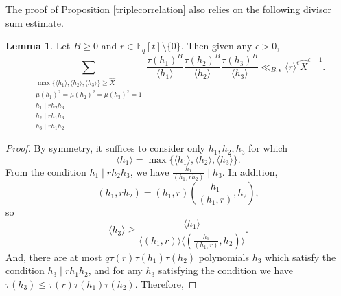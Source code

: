 \documentclass{article}
\theoremstyle{definition}
\newtheorem{lem}{Lemma}[section]
\theoremstyle{definition}
\theoremstyle{remark}
\newcommand{\F}{\mathbb{F}_q[t]}
\newcommand{\1}{\mathbf{1}}
\numberwithin{equation}{section}
\begin{document}
The proof of Proposition \ref{triplecorrelation} also relies on the following divisor sum estimate. 
\begin{lem}\label{bound2}
Let $B\geq 0$ and $r\in \F\setminus\{0\}$. Then given any $\epsilon>0$,
\[\sum_{\substack{\max\{\langle h_1\rangle, \langle h_2\rangle, \langle h_3\rangle\}\geq \widehat{X}\\ \mu(h_1)^2=\mu(h_2)^2=\mu(h_3)^2=1\\ h_1\mid rh_2h_3\\ h_2\mid rh_1h_3\\ h_3\mid rh_1h_2}}\frac{\tau(h_1)^B}{\langle h_1\rangle }\frac{\tau(h_2)^B}{\langle h_2\rangle }\frac{\tau(h_3)^B}{\langle h_3\rangle }\ll_{B,\epsilon} \langle r \rangle^{\epsilon}\widehat{X}^{\epsilon-1}.\]
\end{lem}
\begin{proof}
By symmetry, it suffices to consider only $h_1,h_2, h_3$ for which 
\[\langle h_1\rangle =\max\{\langle h_1\rangle ,\langle h_2\rangle, \langle h_3\rangle\}.\]
From the condition $h_1\mid rh_2h_3$, we have $\frac{h_1}{(h_1,rh_2)}\mid h_3$. In addition, 
\[(h_1,rh_2)=(h_1,r)\left(\frac{h_1}{(h_1,r)},h_2\right),\]
so
\[\langle h_3\rangle \geq \frac{\langle h_1\rangle }{\langle (h_1,r)\rangle \langle(\frac{h_1}{(h_1,r)},h_2) \rangle }.\]
And, there are at most $q\tau(r)\tau(h_1)\tau(h_2)$ polynomials $h_3$ which satisfy the condition $h_3\mid rh_1h_2$, and for any $h_3$ satisfying the condition we have $\tau(h_3)\leq \tau(r)\tau(h_1)\tau(h_2)$. Therefore, 



\end{proof}
\end{document}
